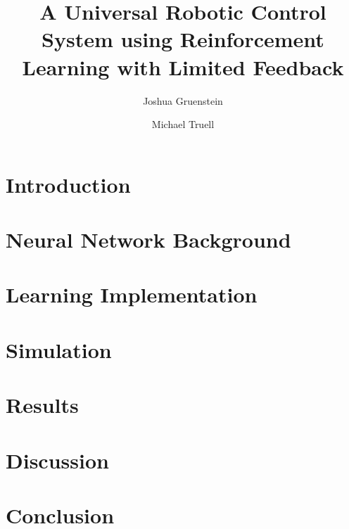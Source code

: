 \documentclass[letterpaper,11pt]{article}
\title{A Universal Robotic Control System using Reinforcement Learning with Limited Feedback}
\author{Joshua Gruenstein \and Michael Truell}
\begin{document}
\maketitle





\pagebreak

\section{Introduction}



\section{Neural Network Background}



\section{Learning Implementation}



\section{Simulation}



\section{Results}



\section{Discussion}



\section{Conclusion}



\nocite{gaskett,geoffrey,werbos,dini,macleod,dongsoo,dudek,watkins,rummery,baird}

\pagebreak


\end{document}

